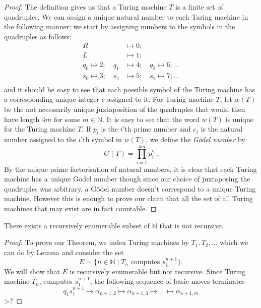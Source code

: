 \begin{proof}
  The definition gives us that a Turing machine $T$ is a finite set of quadruples. We can assign a unique natural number to each Turing machine in the following manner; we start by assigning numbers to the symbols in the quadruples as follows:
  \begin{align*}
    R &\mapsto 0; \\
    L &\mapsto 1; \\
    q_0 \mapsto 2; \quad q_1 &\mapsto 4; \quad q_2 \mapsto 6; \dots \\
    s_0 \mapsto 3; \quad s_1 &\mapsto 5; \quad s_2 \mapsto 7; \dots \\
  \end{align*}
  and it should be easy to see that each possible symbol of the Turing machine has a corresponding unique integer $e$ assigned to it. For Turing machine $T$, let $w(T)$ be the not necessarily unique juxtaposition of the quadruples that would then have length $4m$ for some $m \in \mathbb{N}$. It is easy to see that the word $w(T)$ is unique for the Turing machine $T$. If $p_i$ is the $i$'th prime number and $e_i$ is the natural number assigned to the $i$'th symbol in $w(T)$, we define the \emph{G\"odel number} by
  \begin{equation*}
    G(T) = \prod_{i=1}^{4m} p_i^{e_i}.
  \end{equation*}
  By the unique prime factorisation of natural numbers, it is clear that each Turing machine has a unique G\"odel number though since our choice of juxtaposing the quadruples was arbitrary, a G\"odel number doesn't correspond to a unique Turing machine. However this is enough to prove our claim that all the set of all Turing machines that may exist are in fact countable.
\end{proof}

\begin{theorem}
  \label{thm:natural}
  There exists a recursively enumerable subset of $\mathbb{N}$ that is not recursive.
\end{theorem}

\begin{proof}
  To prove our Theorem, we index Turing machines by $T_1,T_2, \dots$ which we can do by Lemma and consider the set
  \begin{equation*}
    E = \{ n \in \mathbb{N} \mid T_n \text{ computes }s_1^{n+1} \}.
  \end{equation*}
  We will show that $E$ is recursively enumerable but not recursive. Since Turing machine $T_n$, computes $s_1^{n+1}$, the following sequence of basic moves terminates
  \begin{equation*}
    q_1 s_1^{n+1} \mapsto \alpha_{n+1,2} \mapsto \alpha_{n+1,3} \mapsto \dots \mapsto \alpha_{n+1,m}
  \end{equation*}
  >?
\end{proof}



